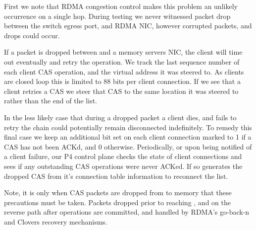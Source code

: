 First we note that RDMA congestion control makes this problem an unlikely
occurrence on a single hop. During testing we never witnessed packet drop
between the switch egress port, and RDMA NIC, however corrupted packets, and
drops could occur.

If a packet is dropped between \sword and a memory servers NIC, the client will
time out eventually and retry the operation. We track the last sequence number
of each client CAS operation, and the virtual address it was steered to. As
clients are closed loop this is limited to 88 bits per client connection. If we
see that a client retries a CAS we steer that CAS to the same location it was
steered to rather than the end of the list.

In the less likely case that during a dropped packet a client dies, and fails to
retry the chain could potentially remain disconnected indefinitely. To remedy
this final case we keep an additional bit set on each client connection marked
to 1 if a CAS has not been ACKd, and 0 otherwise. Periodically, or upon being
notified of a client failure, our P4 control plane checks the state of client
connections and sees if any outstanding CAS operations were never ACKed. If so
\sword generates the dropped CAS from it's connection table information to
reconnect the list.

Note, it is only when CAS packets are dropped from \sword to memory that these
precautions must be taken. Packets dropped prior to reaching \sword, and on the
reverse path after operations are committed, and handled by RDMA's go-back-n and
Clovers recovery mechanisms.






